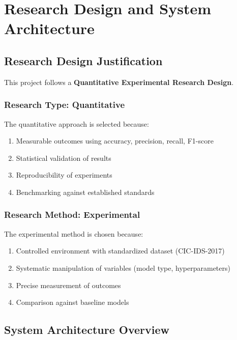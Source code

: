\documentclass[12pt,a4paper]{article}
\begin{document}
\section{Research Design and System Architecture}

\subsection{Research Design Justification}

This project follows a \textbf{Quantitative Experimental Research Design}.

\subsubsection{Research Type: Quantitative}

The quantitative approach is selected because:
\begin{enumerate}
    \item Measurable outcomes using accuracy, precision, recall, F1-score
    \item Statistical validation of results
    \item Reproducibility of experiments
    \item Benchmarking against established standards
\end{enumerate}

\subsubsection{Research Method: Experimental}

The experimental method is chosen because:
\begin{enumerate}
    \item Controlled environment with standardized dataset (CIC-IDS-2017)
    \item Systematic manipulation of variables (model type, hyperparameters)
    \item Precise measurement of outcomes
    \item Comparison against baseline models
\end{enumerate}

\subsection{System Architecture Overview}
\label{sec:architecture_overview}
\end{document}
